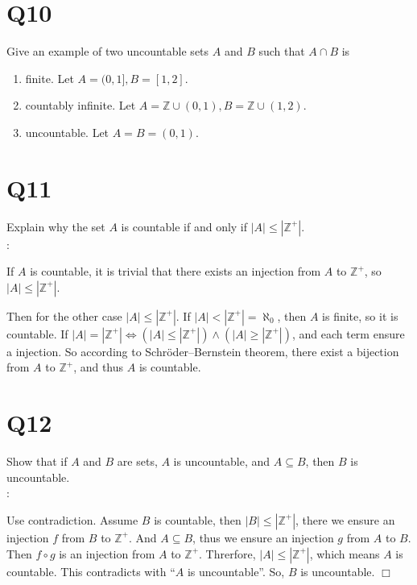 \documentclass[11pt]{article}
\newenvironment{qparts}{\begin{enumerate}[{(}a{)}]}{\end{enumerate}}
\def\endproofmark{$\Box$}
\newenvironment{proof}{{\bf Proof}:}{\endproofmark\smallskip}
\newenvironment{solution}{{\bf Solution}:}{\smallskip}
\begin{document}
\section*{Q10}
Give an example of two uncountable sets $A$ and $B$ such that
$A \cap B$ is
\begin{qparts}
    
    \item finite. Let $A=(0,1], B=[1,2]$.
    \item countably inﬁnite. 
    Let $A=\mathbb{Z}\cup (0,1), B=\mathbb{Z} \cup (1,2)$.
    
    \item uncountable.
    Let $A=B=(0,1)$.

\end{qparts}

\section*{Q11}
Explain why the set $A$ is countable 
if and only if $\left\vert A \right\vert \le \left\vert \mathbb{Z}^{+} \right\vert $.\\
\begin{solution}

    If $A$ is countable, it is trivial that
    there exists an injection from $A$ to $\mathbb{Z}^{+}$,
    so $\left\vert A \right\vert \le \left\vert \mathbb{Z}^{+} \right\vert $.

    Then for the other case $\left\vert A \right\vert \le \left\vert 
        \mathbb{Z}^{+}
    \right\vert $. If $\left\vert A \right\vert <
    \left\vert \mathbb{Z}^{+} \right\vert=\aleph_0 $, then
    $A$ is finite, so it is countable. If $\left\vert A 
    \right\vert =\left\vert \mathbb{Z}^{+} \right\vert \iff
    (\left\vert A \right\vert \le \left\vert \mathbb{Z}^{+} \right\vert 
    )\land (\left\vert A \right\vert \ge \left\vert \mathbb{Z}^{+} \right\vert )$, and each term ensure a injection. So according to Schröder–Bernstein theorem, there exist a bijection from $A$ to $\mathbb{Z}^{+}$, and thus 
    $A$ is countable.
\end{solution}

\section*{Q12}
Show that if $A$ and $B$ are sets, $A$ is uncountable, and $A \subseteq B$,
then $B$ is uncountable.\\
\begin{proof}

    Use contradiction. Assume $B$ is countable, then $\left\vert B  \right\vert 
    \le \left\vert \mathbb{Z}^{+} \right\vert $, there we ensure an injection $f$ from $B$ to $\mathbb{Z}^{+}$. And $A \subseteq B$, thus we 
    ensure an injection $g$ from $A$ to $B$. Then $f \circ  g$ is an injection from $A$ to $\mathbb{Z}^{+}$. Threrfore, $\left\vert A  \right\vert \le 
    \left\vert \mathbb{Z}^{+} \right\vert $, which means $A$ is countable.
    This contradicts
    with ``$A$ is uncountable''. So, $B$ is uncountable.
\end{proof}
\end{document}

